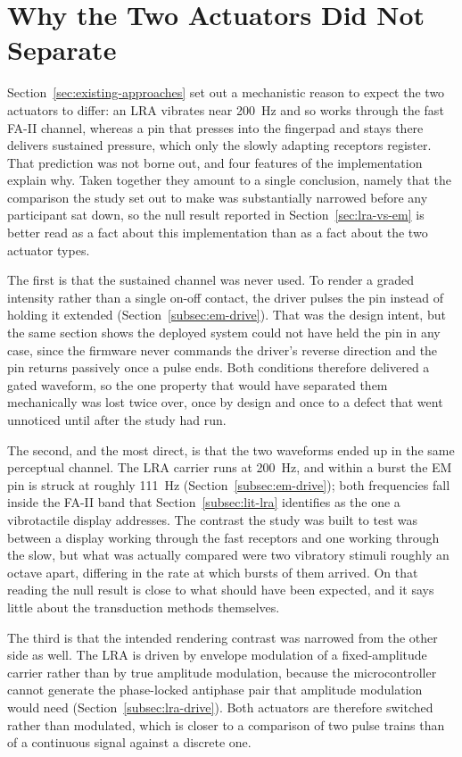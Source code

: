\documentclass[12pt, a4paper, twoside, openright]{report}
\begin{document}
\section{Why the Two Actuators Did Not Separate}
\label{sec:why-no-separation}

Section~\ref{sec:existing-approaches} set out a mechanistic reason to expect
the two actuators to differ: an LRA vibrates near \SI{200}{\hertz} and so works
through the fast FA-II channel, whereas a pin that presses into the fingerpad
and stays there delivers sustained pressure, which only the slowly adapting
receptors register. That prediction was not borne out, and four features of the
implementation explain why. Taken together they amount to a single conclusion,
namely that the comparison the study set out to make was substantially narrowed
before any participant sat down, so the null result reported in
Section~\ref{sec:lra-vs-em} is better read as a fact about this implementation
than as a fact about the two actuator types.

The first is that the sustained channel was never used. To render a graded
intensity rather than a single on-off contact, the driver pulses the pin
instead of holding it extended (Section~\ref{subsec:em-drive}). That was the
design intent, but the same section shows the deployed system could not have
held the pin in any case, since the firmware never commands the driver's
reverse direction and the pin returns passively once a pulse ends. Both
conditions therefore delivered a gated waveform, so the one property that would
have separated them mechanically was lost twice over, once by design and once
to a defect that went unnoticed until after the study had run.

The second, and the most direct, is that the two waveforms ended up in the same
perceptual channel. The LRA carrier runs at \SI{200}{\hertz}, and within a
burst the EM pin is struck at roughly \SI{111}{\hertz}
(Section~\ref{subsec:em-drive}); both frequencies fall inside the FA-II band
that Section~\ref{subsec:lit-lra} identifies as the one a vibrotactile display
addresses. The contrast the study was built to test was between a display
working through the fast receptors and one working through the slow, but what
was actually compared were two vibratory stimuli roughly an octave apart,
differing in the rate at which bursts of them arrived. On that reading the null
result is close to what should have been expected, and it says little about the
transduction methods themselves.

The third is that the intended rendering contrast was narrowed from the other
side as well. The LRA is driven by envelope modulation of a fixed-amplitude
carrier rather than by true amplitude modulation, because the microcontroller
cannot generate the phase-locked antiphase pair that amplitude modulation would
need (Section~\ref{subsec:lra-drive}). Both actuators are therefore switched
rather than modulated, which is closer to a comparison of two pulse trains than
of a continuous signal against a discrete one.
\end{document}
